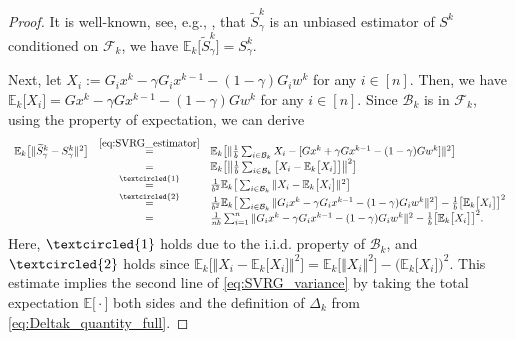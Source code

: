 \documentclass{article}
\newcommand{\norms}[1]{\Vert#1\Vert}
\newcommand{\Expsk}[2]{\mathbb{E}_{#1}\big[#2\big]}
\newcommand{\Expk}[1]{\mathbb{E}\big[#1\big]}
\newcommand{\Bc}{\mathcal{B}}
\newcommand{\Fc}{\mathcal{F}}
\newcommand{\myeqc}[1]{ {\scriptsize\textcircled{#1}} }
\theoremstyle{plain}
\theoremstyle{definition}
\theoremstyle{remark}
\begin{document}
\begin{proof}
It is well-known, see, e.g., \citep{SVRG}, that $\widetilde{S}_{\gamma}^k$ is an unbiased estimator of $S^k$ conditioned on $\Fc_k$, we have $\Expsk{k}{\widetilde{S}_{\gamma}^k}  =  S_{\gamma}^k$.

Next, let $X_i := G_ix^k - \gamma G_ix^{k-1} - (1-\gamma)G_iw^k$ for any $i \in [n]$.
Then, we have $\Expsk{k}{X_i} = Gx^k - \gamma Gx^{k-1} -  (1-\gamma)Gw^k$ for any $i \in [n]$.
Since $\Bc_k$ is in $\Fc_k$, using the property of expectation, we can derive
\begin{equation*} 
\begin{array}{lcl}
\Expsk{k}{ \norms{  \widetilde{S}_{\gamma}^k - S_{\gamma}^k }^2 } & \overset{\tiny\eqref{eq:SVRG_estimator}}{=} & \Expsk{k}{\norms{ \frac{1}{b}\sum_{i\in\Bc_k}X_i  -  [ Gx^k + \gamma Gx^{k-1} -  (1-\gamma)Gw^k ] }^2 } \\
& = & \Expsk{k}{ \big\Vert \frac{1}{b}\sum_{i\in\Bc_k}\big[ X_i  -  \Expsk{k}{X_i} \big] \big\Vert^2 } \\
&\overset{\myeqc{1}}{ = } & \frac{1}{b^2} \Expsk{k}{ \sum_{i\in\Bc_k}\norms{X_i -  \Expsk{k}{X_i} }^2 }   \\
&\overset{\myeqc{2}}{ = } & \frac{1}{b^2} \Expsk{k}{ \sum_{i\in\Bc_k}\norms{  G_ix^k - \gamma G_ix^{k-1} - (1-\gamma)G_iw^k }^2 } - \frac{1}{b} \big[ \Expsk{k}{X_i} \big]^2  \\
& = & \frac{1}{n b}  \sum_{i = 1}^n \norms{  G_ix^k - \gamma G_ix^{k-1} - (1-\gamma)G_iw^k }^2 - \frac{1}{b} \big[ \Expsk{k}{X_i} \big]^2.
\end{array}
\end{equation*}
Here, $\myeqc{1}$ holds due to the i.i.d. property of $\Bc_k$, and  $\myeqc{2}$ holds since $\Expsk{k}{\norms{X_i - \Expsk{k}{X_i}}^2} = \Expsk{k}{\norms{X_i}^2} - \big( \Expsk{k}{ X_i} \big)^2$.
This estimate implies the second line of \eqref{eq:SVRG_variance} by taking the total expectation $\Expk{\cdot}$ both sides and the definition of $\Delta_k$ from \eqref{eq:Deltak_quantity_full}.


\end{proof}
\end{document}
